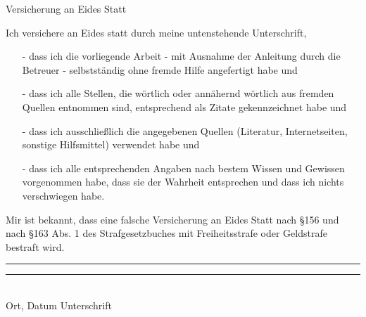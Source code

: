 \vspace*{1cm}
\begin{center}
\large{Versicherung an Eides Statt}
\end{center}
\vspace{1cm}
Ich versichere an Eides statt durch meine untenstehende Unterschrift,
\begin{itemize}
\item[-] dass ich die vorliegende Arbeit - mit Ausnahme der Anleitung durch die Betreuer - selbstst\"andig ohne fremde Hilfe angefertigt habe und
\item[-] dass ich alle Stellen, die w\"ortlich oder ann\"ahernd w\"ortlich aus fremden Quellen entnommen sind, entsprechend als Zitate gekennzeichnet habe und
\item[-] dass ich ausschlie\ss{}lich die angegebenen Quellen (Literatur, Internetseiten, sonstige Hilfsmittel) verwendet habe und
\item[-] dass ich alle entsprechenden Angaben nach bestem Wissen und Gewissen vorgenommen habe, dass sie der Wahrheit entsprechen und dass ich nichts verschwiegen habe.
\end{itemize}
Mir ist bekannt, dass eine falsche Versicherung an Eides Statt nach \S 156 und nach \S 163 Abs. 1 des Strafgesetzbuches mit Freiheitsstrafe oder Geldstrafe bestraft wird.\newline
\vspace*{3cm}


\noindent\rule{5cm}{0.5pt}\hspace*{6cm}	\noindent\rule{5cm}{0.5pt}\\
\hspace*{1.5cm} Ort, Datum   \hspace*{9cm} 								    Unterschrift 
